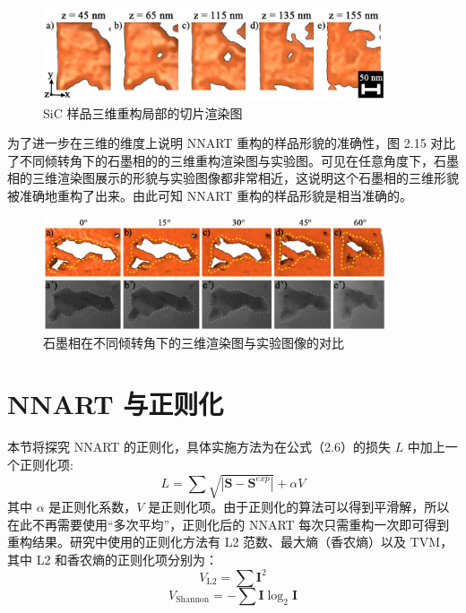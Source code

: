 \begin{figure}[htbp]
	\vspace{\baselineskip}
	\centering
	\includegraphics[width=0.9\textwidth]{../3.18/318}
	\caption{SiC 样品三维重构局部的切片渲染图}\label{fig:310}
	\song{}
\end{figure}

为了进一步在三维的维度上说明 NNART 重构的样品形貌的准确性，图 2.15 对比了不同倾转角下的石墨相的的三维重构渲染图与实验图。可见在任意角度下，石墨相的三维渲染图展示的形貌与实验图像都非常相近，这说明这个石墨相的三维形貌被准确地重构了出来。由此可知 NNART 重构的样品形貌是相当准确的。
\begin{figure}[htbp]
	\vspace{\baselineskip}
	\centering
	\includegraphics[width=0.9\textwidth]{../3.17/317}
	\caption{石墨相在不同倾转角下的三维渲染图与实验图像的对比}\label{fig:310}
	\song{}
\end{figure}

\section{NNART 与正则化}
本节将探究 NNART 的正则化，具体实施方法为在公式（2.6）的损失 $L$ 中加上一个正则化项:
\begin{equation}
L = \sum {\sqrt{|\boldsymbol{S}-\boldsymbol{S}^{exp}|}}+\alpha V
\end{equation}
其中 $\alpha$ 是正则化系数，$V$ 是正则化项。由于正则化的算法可以得到平滑解，所以在此不再需要使用“多次平均”，正则化后的 NNART 每次只需重构一次即可得到重构结果。研究中使用的正则化方法有 L2 范数、最大熵（香农熵）以及 TVM，其中 L2 和香农熵的正则化项分别为：
\begin{equation}
V_{\text{L2}} = \sum \boldsymbol{I}^2
\end{equation}
\begin{equation}
V_{\text{Shannon}} = -\sum \boldsymbol{I} \log_2 \boldsymbol{I}
\end{equation}

